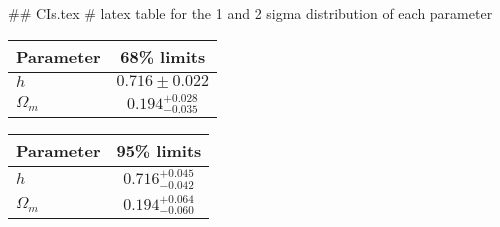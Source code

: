 ## CIs.tex
# latex table for the 1 and 2 sigma distribution of each parameter

\begin{tabular} { l  c}
 Parameter &  68\% limits\\
\hline
{\boldmath$h              $} & $0.716\pm 0.022            $\\
{\boldmath$\Omega_m       $} & $0.194^{+0.028}_{-0.035}   $\\
\hline
\end{tabular}

\begin{tabular} { l  c}
 Parameter &  95\% limits\\
\hline
{\boldmath$h              $} & $0.716^{+0.045}_{-0.042}   $\\
{\boldmath$\Omega_m       $} & $0.194^{+0.064}_{-0.060}   $\\
\hline
\end{tabular}
